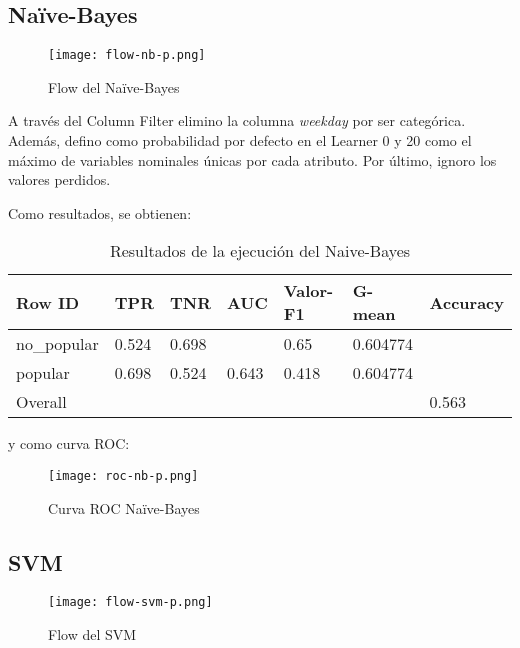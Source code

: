 \subsection{Naïve-Bayes}

\begin{figure}[H] %
	\centering
	\texttt{[image: flow-nb-p.png]}  %
	\caption{Flow del Naïve-Bayes} 
	\label{fig:flow-nb}
\end{figure}

A través del Column Filter elimino la columna \textit{weekday} por ser categórica. Además, defino como probabilidad por defecto en el Learner 0 y 20 como el máximo de variables nominales únicas por cada atributo. Por último, ignoro los valores perdidos.

Como resultados, se obtienen:

\begin{table}[H]
	\centering
	\begin{tabular}{|l|l|l|l|l|l|l|}
		\hline
		Row ID      & TPR   & TNR   & AUC   & Valor-F1 & G-mean   & Accuracy \\ \hline
		no\_popular & 0.524 & 0.698 &       & 0.65     & 0.604774 &          \\ \hline
		popular     & 0.698 & 0.524 & 0.643 & 0.418    & 0.604774 &          \\ \hline
		Overall     &       &       &       &          &          & 0.563    \\ \hline
	\end{tabular}
	\caption{Resultados de la ejecución del Naive-Bayes}
	\label{tab:nb}
\end{table}

y como curva ROC:


\begin{figure}[H] %
	\centering
	\texttt{[image: roc-nb-p.png]}  %
	\caption{Curva ROC Naïve-Bayes} 
	\label{fig:rocknb-p}
\end{figure}

\subsection{SVM}

\begin{figure}[H] %
	\centering
	\texttt{[image: flow-svm-p.png]}  %
	\caption{Flow del SVM} 
	\label{fig:flow-svm}
\end{figure}


